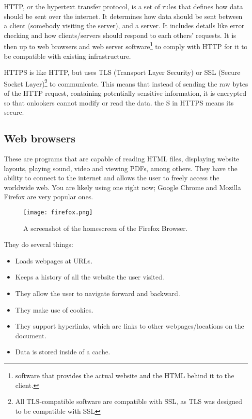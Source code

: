 \documentclass[../main.tex]{subfiles}
\begin{document}
HTTP, or the hypertext transfer protocol, is a set of rules that defines how data should be sent over the internet. It determines how data should be sent between a client (somebody visiting the server), and a server. It includes details like error checking and how clients/servers should respond to each others' requests. It is then up to web browsers and web server software\footnote{software that provides the actual website and the HTML behind it to the client.} to comply with HTTP for it to be compatible with existing infrastructure.

HTTPS is like HTTP, but uses TLS (Transport Layer Security) or SSL (Secure Socket Layer)\footnote{All TLS-compatible software are compatible with SSL, as TLS was designed to be compatible with SSL} to communicate. This means that instead of sending the raw bytes of the HTTP request, containing potentially sensitive information, it is encrypted so that onlookers cannot modify or read the data. the S in HTTPS means its secure.

\subsection{Web browsers}

These are programs that are capable of reading HTML files, displaying website layouts, playing sound, video and viewing PDFs, among others. They have the ability to connect to the internet and allows the user to freely access the worldwide web. You are likely using one right now; Google Chrome and Mozilla Firefox are very popular ones.

\begin{figure}[H]
    \centering
    \texttt{[image: firefox.png]}
    \caption{A screenshot of the homescreen of the Firefox Browser.}
    \label{fig:firefox}
\end{figure}

They do several things:

\begin{itemize}
    \item Loads webpages at URLs.
    \item Keeps a history of all the website the user visited.
    \item They allow the user to navigate forward and backward.
    \item They make use of cookies.
    \item They support hyperlinks, which are links to other webpages/locations on the document.
    \item Data is stored inside of a cache.
\end{itemize}
\end{document}
